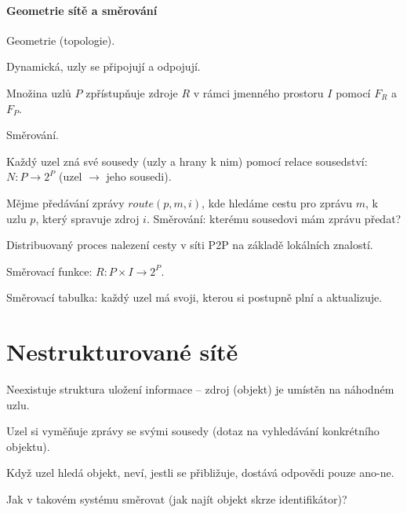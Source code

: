 \paragraph*{Geometrie sítě a směrování} \begin{compactitem}

    \item Geometrie (topologie). \begin{compactitem}
        \item Dynamická, uzly se připojují a odpojují.
        \item Množina uzlů $P$ zpřístupňuje zdroje $R$ v rámci jmenného prostoru $I$ pomocí $F_R$ a $F_P$.
    \end{compactitem}

    \item Směrování. \begin{compactitem}
        \item Každý uzel zná své sousedy (uzly a hrany k nim) pomocí relace sousedství: $N : P \rightarrow 2^P$ (uzel $\rightarrow$ jeho sousedi).
        \item Mějme předávání zprávy $route(p, m, i)$, kde hledáme cestu pro zprávu $m$, k uzlu $p$, který spravuje zdroj $i$. Směrování: kterému sousedovi mám zprávu předat?
        \item Distribuovaný proces nalezení cesty v síti P2P na základě lokálních znalostí.
        \item Směrovací funkce: $R : P \times I \rightarrow 2^P$.
        \item Směrovací tabulka: každý uzel má svoji, kterou si postupně plní a aktualizuje.
    \end{compactitem}

\end{compactitem}


\section{Nestrukturované sítě}

\begin{compactitem}
    \item Neexistuje struktura uložení informace -- zdroj (objekt) je umístěn na náhodném uzlu.
    \item Uzel si vyměňuje zprávy se svými sousedy (dotaz na vyhledávání konkrétního objektu).
    \item Když uzel hledá objekt, neví, jestli se přibližuje, dostává odpovědi pouze ano-ne.
    \item Jak v takovém systému směrovat (jak najít objekt skrze identifikátor)?
\end{compactitem}

